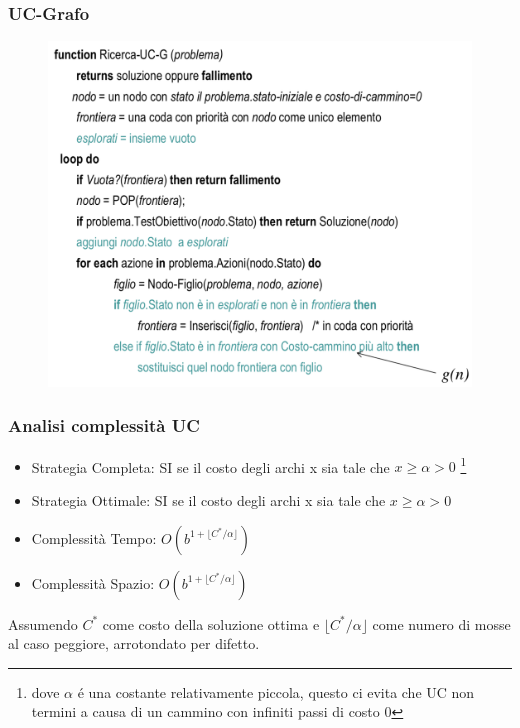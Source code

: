 \documentclass{article}
\begin{document}
\subsubsection{UC-Grafo}
\begin{figure}[H]
    \centering
    \includegraphics[scale=0.50]{Images/UC-G.png}
\end{figure}

\subsubsection{Analisi complessità UC}
\begin{itemize}
    \item Strategia Completa: SI se il costo degli archi x sia tale che $ x \geq \alpha > 0$ \footnote{dove $\alpha$ é una costante relativamente piccola, questo ci evita che UC non termini a causa di un cammino con infiniti passi di costo 0}
    \item Strategia Ottimale: SI se il costo degli archi x sia tale che $ x \geq \alpha > 0$
    \item Complessità Tempo: $O(b^{1+ \lfloor C^*/\alpha \rfloor})$
    \item Complessità Spazio: $O(b^{1+ \lfloor C^*/\alpha \rfloor})$
\end{itemize}
Assumendo $C^*$ come costo della soluzione ottima e $\lfloor C^*/\alpha \rfloor$ come numero di mosse al caso peggiore, arrotondato per difetto.
\end{document}
